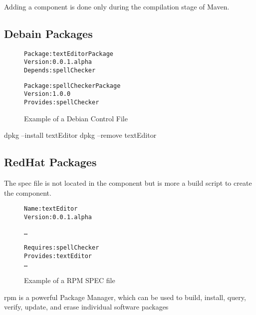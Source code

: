 Adding a component is done only during the compilation stage of Maven.

\subsection{Debain Packages}

\begin{figure}[htp]
\begin{center}
\begin{alltt}
Package: textEditorPackage
Version: 0.0.1.alpha
Depends: spellChecker

Package: spellCheckerPackage
Version: 1.0.0
Provides: spellChecker

\end{alltt}
  \caption[Debian Control file]{Example of a Debian Control File}
  \label{osgibundle}
\end{center}
\end{figure}

dpkg --install textEditor
dpkg --remove textEditor




\subsection{RedHat Packages}    

The spec file is not located in the component but is more a build script to create the component.
\begin{figure}[htp]
\begin{center}
\begin{alltt}
Name:      textEditor
Version:   0.0.1.alpha

\ldots

Requires: spellChecker
Provides: textEditor
\ldots
\end{alltt}
  \caption[RPM SPEC file example]{Example of a RPM SPEC file}
  \label{osgibundle}
\end{center}
\end{figure}


rpm is a powerful Package Manager, which can be used to build, install, query, verify, update, and erase individual software packages

